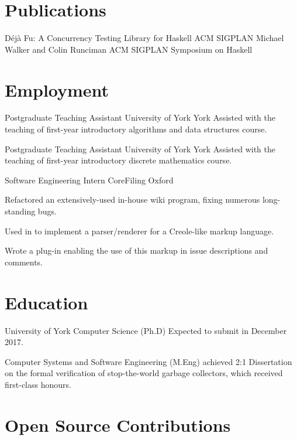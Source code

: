 \documentclass[a4paper]{cv}
\begin{document}
\section{Publications}

  {Déjà Fu: A Concurrency Testing Library for Haskell}
  {ACM SIGPLAN}
  {Michael Walker and Colin Runciman}
  {ACM SIGPLAN Symposium on Haskell}

\section{Employment}

  {Postgraduate Teaching Assistant}
  {University of York}
  {York}
  {Assisted with the teaching of first-year introductory algorithms and
    data structures course.}

  {Postgraduate Teaching Assistant}
  {University of York}
  {York}
  {Assisted with the teaching of first-year introductory discrete mathematics course.}

  {Software Engineering Intern}
  {CoreFiling}
  {Oxford}
  {\begin{tightitemize}
    \item Refactored an extensively-used in-house wiki program, fixing
      numerous long-standing bugs.
    \item Used  in  to implement a
      parser/renderer for a Creole-like markup language.
    \item Wrote a  plug-in enabling the use of this
      markup in issue descriptions and comments.
    \end{tightitemize}}

\section{Education}

\begin{educated}{University of York}
  {Computer Science (Ph.D)}
  {}
  {Expected to submit in December 2017.}

  {Computer Systems and Software Engineering (M.Eng)}
  {achieved 2:1}
  {Dissertation on the formal verification of stop-the-world garbage
    collectors, which received first-class honours.}
\end{educated}

\section{Open Source Contributions}
\end{document}
